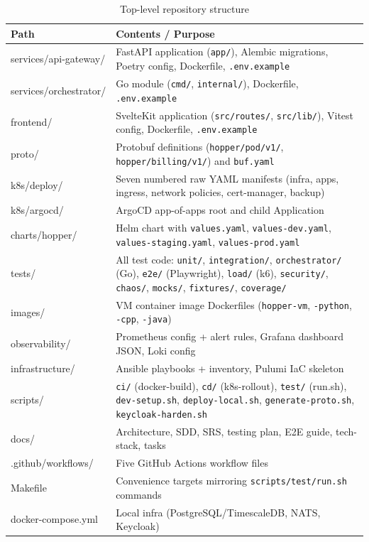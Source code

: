 \documentclass[12pt,a4paper]{article}
\begin{document}
\begin{table}[!htbp]
\centering
\caption{Top-level repository structure}
\label{tab:structure}
\setlength{\tabcolsep}{4pt}
\renewcommand{\arraystretch}{1.2}
\begin{tabularx}{\textwidth}{|>{\RaggedRight\arraybackslash}p{4.2cm}|>{\RaggedRight\arraybackslash}X|}
\hline
\textbf{Path} & \textbf{Contents / Purpose} \\
\hline
services/api-gateway/ & FastAPI application (\texttt{app/}), Alembic migrations, Poetry config, Dockerfile, \texttt{.env.example} \\
\hline
services/orchestrator/ & Go module (\texttt{cmd/}, \texttt{internal/}), Dockerfile, \texttt{.env.example} \\
\hline
frontend/ & SvelteKit application (\texttt{src/routes/}, \texttt{src/lib/}), Vitest config, Dockerfile, \texttt{.env.example} \\
\hline
proto/ & Protobuf definitions (\texttt{hopper/pod/v1/}, \texttt{hopper/billing/v1/}) and \texttt{buf.yaml} \\
\hline
k8s/deploy/ & Seven numbered raw YAML manifests (infra, apps, ingress, network policies, cert-manager, backup) \\
\hline
k8s/argocd/ & ArgoCD app-of-apps root and child Application \\
\hline
charts/hopper/ & Helm chart with \texttt{values.yaml}, \texttt{values-dev.yaml}, \texttt{values-staging.yaml}, \texttt{values-prod.yaml} \\
\hline
tests/ & All test code: \texttt{unit/}, \texttt{integration/}, \texttt{orchestrator/} (Go), \texttt{e2e/} (Playwright), \texttt{load/} (k6), \texttt{security/}, \texttt{chaos/}, \texttt{mocks/}, \texttt{fixtures/}, \texttt{coverage/} \\
\hline
images/ & VM container image Dockerfiles (\texttt{hopper-vm}, \texttt{-python}, \texttt{-cpp}, \texttt{-java}) \\
\hline
observability/ & Prometheus config + alert rules, Grafana dashboard JSON, Loki config \\
\hline
infrastructure/ & Ansible playbooks + inventory, Pulumi IaC skeleton \\
\hline
scripts/ & \texttt{ci/} (docker-build), \texttt{cd/} (k8s-rollout), \texttt{test/} (run.sh), \texttt{dev-setup.sh}, \texttt{deploy-local.sh}, \texttt{generate-proto.sh}, \texttt{keycloak-harden.sh} \\
\hline
docs/ & Architecture, SDD, SRS, testing plan, E2E guide, tech-stack, tasks \\
\hline
.github/workflows/ & Five GitHub Actions workflow files \\
\hline
Makefile & Convenience targets mirroring \texttt{scripts/test/run.sh} commands \\
\hline
docker-compose.yml & Local infra (PostgreSQL/TimescaleDB, NATS, Keycloak) \\
\hline
\end{tabularx}
\end{table}
\end{document}
